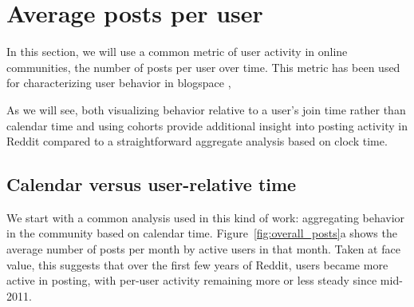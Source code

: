 \section{Average posts per user}

\begin{figure*}[!tb]
\centering
{}
\caption{In Figure (a), monthly average posts per active user over clock time. In Figure (b), the monthly average posts per active users in the user-time referential, i.e., message creation time is measured relative to the user's first post.  Each tick in the x-axis is one year.  In both figures (and all later figures), we consider only active users during each month; users that are either temporarily or permanently away from Reddit are not included.}
\label{fig:overall_posts}
\end{figure*}

In this section, we will use a common metric of user activity in online communities, the number of posts per user over time.  This metric has been used for characterizing user behavior in blogspace \cite{Gruhl2004}, 

As we will see, both visualizing behavior relative to a user's join time rather than calendar time and using cohorts provide additional insight into posting activity in Reddit compared to a straightforward aggregate analysis based on clock time.

\subsection{Calendar versus user-relative time}

We start with a common analysis used in this kind of work: aggregating behavior in the community based on calendar time.  Figure~\ref{fig:overall_posts}a shows the average number of posts per month by active users in that month.  Taken at face value, this suggests that over the first few years of Reddit, users became more active in posting, with per-user activity remaining more or less steady since mid-2011.

